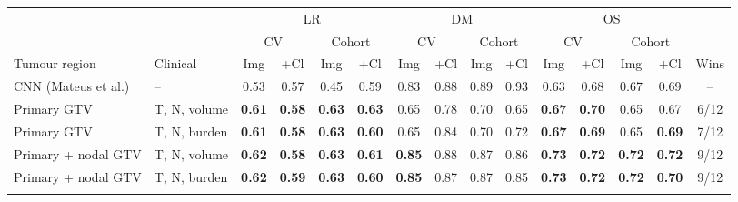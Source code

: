 \begin{tabular}{@{}llccccccccccccc@{}}
\toprule
 & & \multicolumn{4}{c}{LR} & \multicolumn{4}{c}{DM} & \multicolumn{4}{c}{OS} & \\
\cmidrule(lr){3-6}\cmidrule(lr){7-10}\cmidrule(lr){11-14}
 & & \multicolumn{2}{c}{CV} & \multicolumn{2}{c}{Cohort} & \multicolumn{2}{c}{CV} & \multicolumn{2}{c}{Cohort} & \multicolumn{2}{c}{CV} & \multicolumn{2}{c}{Cohort} & \\
Tumour region & Clinical & Img & +Cl & Img & +Cl & Img & +Cl & Img & +Cl & Img & +Cl & Img & +Cl & Wins \\
\midrule
CNN (Mateus et al.) & -- & 0.53 & 0.57 & 0.45 & 0.59 & 0.83 & 0.88 & 0.89 & 0.93 & 0.63 & 0.68 & 0.67 & 0.69 & -- \\
\midrule
Primary GTV & T, N, volume & \textbf{0.61} & \textbf{0.58} & \textbf{0.63} & \textbf{0.63} & 0.65 & 0.78 & 0.70 & 0.65 & \textbf{0.67} & \textbf{0.70} & 0.65 & 0.67 & 6/12 \\
Primary GTV & T, N, burden & \textbf{0.61} & \textbf{0.58} & \textbf{0.63} & \textbf{0.60} & 0.65 & 0.84 & 0.70 & 0.72 & \textbf{0.67} & \textbf{0.69} & 0.65 & \textbf{0.69} & 7/12 \\
Primary + nodal GTV & T, N, volume & \textbf{0.62} & \textbf{0.58} & \textbf{0.63} & \textbf{0.61} & \textbf{0.85} & 0.88 & 0.87 & 0.86 & \textbf{0.73} & \textbf{0.72} & \textbf{0.72} & \textbf{0.72} & 9/12 \\
Primary + nodal GTV & T, N, burden & \textbf{0.62} & \textbf{0.59} & \textbf{0.63} & \textbf{0.60} & \textbf{0.85} & 0.87 & 0.87 & 0.85 & \textbf{0.73} & \textbf{0.72} & \textbf{0.72} & \textbf{0.70} & 9/12 \\
\botrule
\end{tabular}
